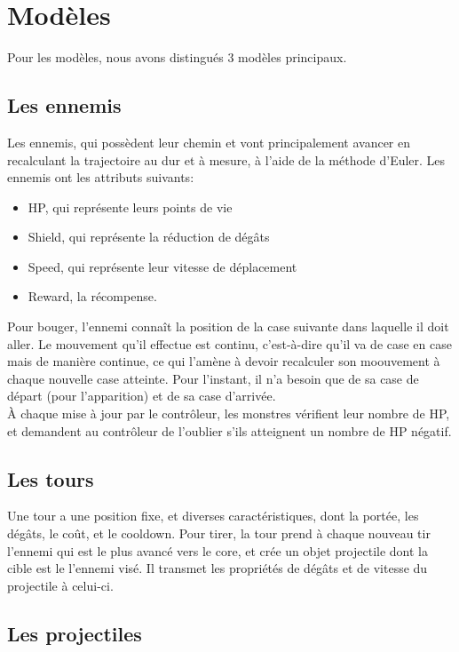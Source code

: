 \documentclass[a4paper,11pt]{article}
\begin{document}

\section{Modèles} \label{models}

Pour les modèles, nous avons distingués 3 modèles principaux.

\subsection{Les ennemis}
Les ennemis, qui possèdent leur chemin et vont principalement avancer en
recalculant la trajectoire au dur et à mesure, à l'aide de la méthode d'Euler.
Les ennemis ont les attributs suivants:
\begin{itemize}
    \item HP, qui représente leurs points de vie
    \item Shield, qui représente la réduction de dégâts
    \item Speed, qui représente leur vitesse de déplacement
    \item Reward, la récompense.
\end{itemize}

Pour bouger, l'ennemi connaît la position de la case suivante dans laquelle il
doit aller. Le mouvement qu'il effectue est continu, c'est-à-dire qu'il va de case
en case mais de manière continue, ce qui l'amène à devoir recalculer son moouvement
à chaque nouvelle case atteinte. Pour l'instant, il n'a besoin que de sa case de
départ (pour l'apparition) et de sa case d'arrivée.\\
À chaque mise à jour par le contrôleur, les monstres vérifient leur nombre de HP,
et demandent au contrôleur de l'oublier s'ils atteignent un nombre de HP négatif.

\subsection{Les tours}

Une tour a une position fixe, et diverses caractéristiques, dont la portée, les
dégâts, le coût, et le cooldown. Pour tirer, la tour prend à chaque nouveau tir
l'ennemi qui est le plus avancé vers le core, et crée un objet projectile dont
la cible est le l'ennemi visé. Il transmet les propriétés de dégâts et de vitesse
du projectile à celui-ci.

\subsection{Les projectiles}
\end{document}
